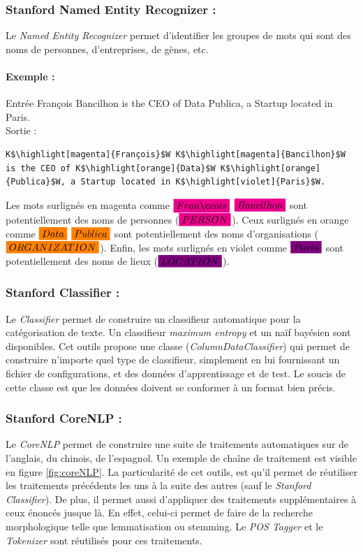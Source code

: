             \subsubsection{Stanford Named Entity Recognizer :}
                Le \textit{Named Entity Recognizer} permet d'identifier les groupes de mots qui sont des noms de personnes, d'entreprises, de gènes, etc.

                \paragraph{Exemple :}
                Entrée \og François Bancilhon is the CEO of Data Publica, a Startup located in Paris.\fg\\
                Sortie :
\begin{lstlisting}
K$\highlight[magenta]{François}$W K$\highlight[magenta]{Bancilhon}$W is the CEO of K$\highlight[orange]{Data}$W K$\highlight[orange]{Publica}$W, a Startup located in K$\highlight[violet]{Paris}$W.
\end{lstlisting}
                Les mots surlignés en magenta comme $\highlight[magenta]{François}$ $\highlight[magenta]{Bancilhon}$ sont potentiellement des noms de personnes (\textit{$\highlight[magenta]{PERSON}$}). Ceux surlignés en orange comme $\highlight[orange]{Data}$ $\highlight[orange]{Publica}$ sont potentiellement des noms d'organisations (\textit{$\highlight[orange]{ORGANIZATION}$}). Enfin, les mots surlignés en violet comme $\highlight[violet]{Paris}$ sont potentiellement des noms de lieux (\textit{$\highlight[violet]{LOCATION}$}).

            \subsubsection{Stanford Classifier :}
                Le \textit{Classifier} permet de construire un classifieur automatique pour la catégorisation de texte. Un classifieur \textit{maximum entropy} et un naïf bayésien sont disponibles. Cet outils propose une classe (\textit{ColumnDataClassifier}) qui permet de construire n'importe quel type de classifieur, simplement en lui fournissant un fichier de configurations, et des données d'apprentissage et de test. Le soucis de cette classe est que les données doivent se conformer à un format bien précis.

            \subsubsection{Stanford CoreNLP :}
                Le \textit{CoreNLP} permet de construire une suite de traitements automatiques sur de l'anglais, du chinois, de l'espagnol. Un exemple de chaîne de traitement est visible en figure \ref{fig:coreNLP}. La particularité de cet outils, est qu'il permet de réutiliser les traitements précédents les uns à la suite des autres (sauf le \textit{Stanford Classifier}). De plus, il permet aussi d'appliquer des traitements supplémentaires à ceux énoncés jusque là. En effet, celui-ci permet de faire de la recherche morphologique telle que lemmatisation ou stemming. Le \textit{POS Tagger} et le \textit{Tokenizer} sont réutilisés pour ces traitements.

